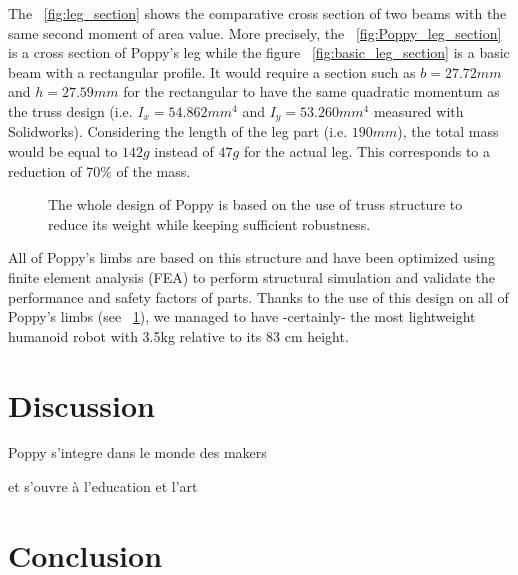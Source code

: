 The \figurename~\ref{fig:leg_section} shows the comparative cross section of two beams with the same second moment of area value. More precisely, the \figurename~\ref{fig:Poppy_leg_section} is a cross section of Poppy's leg while the figure \figurename~\ref{fig:basic_leg_section} is a basic beam with a rectangular profile.
It would require a section such as $b=27.72 mm$ and $h=27.59 mm$ for the rectangular to have the same quadratic momentum as the truss design (i.e. $I_x = 54.862 mm^4$ and $I_y = 53.260 mm^4$ measured with Solidworks).
Considering the length of the leg part (i.e. $190 mm$), the total mass would be equal to $142 g$ instead of $47 g$ for the actual leg. This corresponds to a reduction of 70\% of the mass.

\begin{figure}[!tb]
\centering


    \caption{The whole design of Poppy is based on the use of truss structure to reduce its weight while keeping sufficient robustness.}
    \label{fig:poppy_truss_structure}
\end{figure}

All of Poppy’s limbs are based on this structure and have been optimized using finite element analysis (FEA) to perform structural simulation and validate the performance and safety factors of parts.
Thanks to the use of this design on all of Poppy's limbs (see \figurename~\ref{fig:poppy_truss_structure}), we managed to have -certainly- the most lightweight humanoid robot with 3.5kg relative to its 83 cm height.

\clearpage







\section{Discussion} %

Poppy s'integre dans le monde des makers

et s'ouvre à l'education et l'art





\section{Conclusion} %


